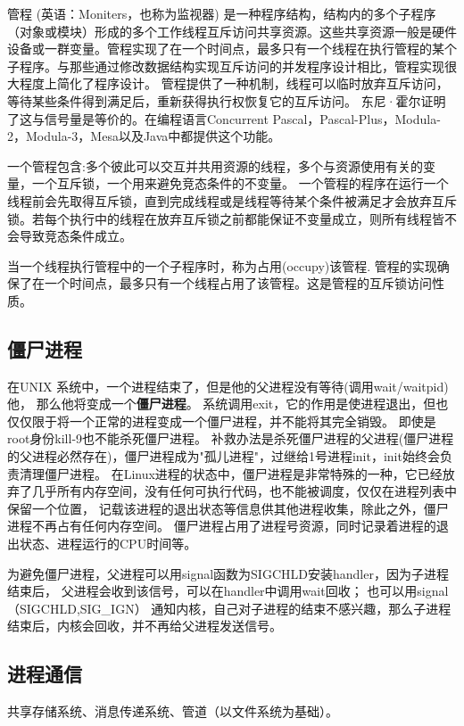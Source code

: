 管程 (英语：Moniters，也称为监视器) 是一种程序结构，结构内的多个子程序（对象或模块）形成的多个工作线程互斥访问共享资源。这些共享资源一般是硬件设备或一群变量。管程实现了在一个时间点，最多只有一个线程在执行管程的某个子程序。与那些通过修改数据结构实现互斥访问的并发程序设计相比，管程实现很大程度上简化了程序设计。
管程提供了一种机制，线程可以临时放弃互斥访问，等待某些条件得到满足后，重新获得执行权恢复它的互斥访问。
东尼·霍尔证明了这与信号量是等价的。在编程语言Concurrent Pascal，Pascal-Plus，Modula-2，Modula-3，Mesa以及Java中都提供这个功能。

一个管程包含:多个彼此可以交互并共用资源的线程，多个与资源使用有关的变量，一个互斥锁，一个用来避免竞态条件的不变量。
一个管程的程序在运行一个线程前会先取得互斥锁，直到完成线程或是线程等待某个条件被满足才会放弃互斥锁。若每个执行中的线程在放弃互斥锁之前都能保证不变量成立，则所有线程皆不会导致竞态条件成立。

当一个线程执行管程中的一个子程序时，称为占用(occupy)该管程. 管程的实现确保了在一个时间点，最多只有一个线程占用了该管程。这是管程的互斥锁访问性质。

\subsection{僵尸进程}
在UNIX 系统中，一个进程结束了，但是他的父进程没有等待(调用wait/waitpid)他， 那么他将变成一个\textbf{僵尸进程}。
系统调用exit，它的作用是使进程退出，但也仅仅限于将一个正常的进程变成一个僵尸进程，并不能将其完全销毁。
即使是root身份kill-9也不能杀死僵尸进程。
补救办法是杀死僵尸进程的父进程(僵尸进程的父进程必然存在)，僵尸进程成为"孤儿进程"，过继给1号进程init，init始终会负责清理僵尸进程。
在Linux进程的状态中，僵尸进程是非常特殊的一种，它已经放弃了几乎所有内存空间，没有任何可执行代码，也不能被调度，仅仅在进程列表中保留一个位置，
记载该进程的退出状态等信息供其他进程收集，除此之外，僵尸进程不再占有任何内存空间。
僵尸进程占用了进程号资源，同时记录着进程的退出状态、进程运行的CPU时间等。

为避免僵尸进程，父进程可以用signal函数为SIGCHLD安装handler，因为子进程结束后， 父进程会收到该信号，可以在handler中调用wait回收；
也可以用signal（SIGCHLD,SIG\_IGN） 通知内核，自己对子进程的结束不感兴趣，那么子进程结束后，内核会回收，并不再给父进程发送信号。

\subsection{进程通信}
共享存储系统、消息传递系统、管道（以文件系统为基础）。

